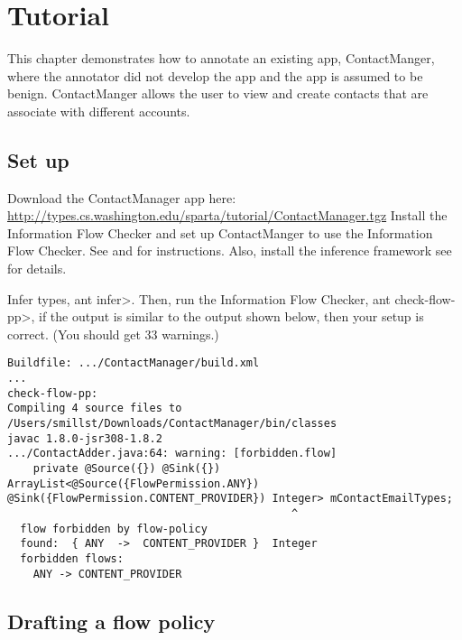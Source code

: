 \htmlhr


\newcommand{\method}[1]{\paragraph{#1}}
\newcommand{\annomethod}[1]{\small{\texttt{#1}}\newline}
\chapter{Tutorial\label{tutorial}}

This chapter demonstrates how to annotate an existing app, ContactManger,
 where the annotator did not develop the app and the app is assumed to be benign.
   ContactManger allows the user to view and create contacts that are associate 
   with different accounts.  


\section{Set up}
Download the ContactManager app here: \url{http://types.cs.washington.edu/sparta/tutorial/ContactManager.tgz}
Install the Information Flow Checker and set up ContactManger to use the Information Flow Checker. 
See   and  for instructions. Also, install the inference framework
see \secref{} for details.

Infer types, \<ant infer>.
Then, run the Information Flow Checker, \<ant check-flow-pp>, if the output is similar to 
the output shown below, then your setup is correct.  (You should get 33 warnings.)

\begin{Verbatim}
Buildfile: .../ContactManager/build.xml
...
check-flow-pp:
Compiling 4 source files to /Users/smillst/Downloads/ContactManager/bin/classes
javac 1.8.0-jsr308-1.8.2
.../ContactAdder.java:64: warning: [forbidden.flow]
    private @Source({}) @Sink({}) ArrayList<@Source({FlowPermission.ANY}) @Sink({FlowPermission.CONTENT_PROVIDER}) Integer> mContactEmailTypes;
                                            ^
  flow forbidden by flow-policy
  found:  { ANY  ->  CONTENT_PROVIDER }  Integer
  forbidden flows:
    ANY -> CONTENT_PROVIDER
\end{Verbatim} 

\section{Drafting a flow policy}

